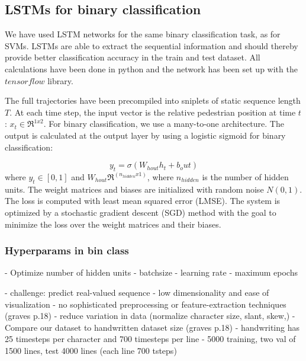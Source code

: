 \subsection{LSTMs for binary classification}
We have used LSTM networks for the same binary classification task, as for SVMs. LSTMs are able to extract the sequential information and should thereby provide better classification accuracy in the train and test dataset. All calculations have been done in python and the network has been set up with the $\textit{tensorflow}$ library.

The full trajectories have been precompiled into sniplets of static sequence length $T$. At each time step, the input vector is the relative pedestrian position at time $t$: $x_t \in \Re^{1x2}$. For binary classification, we use a many-to-one architecture. The output is calculated at the output layer by using a logistic sigmoid for binary classification:

\begin{equation}
y_t = \sigma(W_{hout}h_t + b_out)
\label{eq:bin_class_out} 
\end{equation}
where $y_t \in [0,1]$ and $W_{hout} \Re^(n_{hidden} x 1)$, where $n_{hidden}$ is the number of hidden units. The weight matrices and biases are initialized with random noise $N(0,1)$. The loss is computed with least mean squared error (LMSE). The system is optimized by a stochastic gradient descent (SGD) method with the goal to minimize the loss over the weight matrices and their biases.

\subsubsection{Hyperparams in bin class}
- Optimize number of hidden units
- batchsize
- learning rate
- maximum epochs
 


- challenge: predict real-valued sequence
- low dimensionality and ease of visualization
- no sophisticated preprocessing or feature-extraction techniques (graves p.18)
	- reduce variation in data (normalize character size, slant, skew,)
- Compare our dataset to handwritten dataset size (graves p.18)
- handwriting has 25 timesteps per character and 700 timesteps per line
- 5000 training, two val of 1500 lines, test 4000 lines (each line 700 tsteps)

